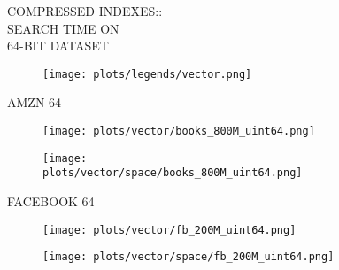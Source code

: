 \documentclass{article}
\begin{document}
\begin{figure}[!htbp]
\fbox
{
\begin{minipage}[t][0.98\textheight][t]{\textwidth}
\centering
\vspace*{-0.2cm}
    \begin{minipage}{0.23\linewidth}
    \footnotesize{COMPRESSED INDEXES::\\SEARCH TIME ON \\ 64-BIT DATASET}
    \end{minipage}
   \begin{minipage}{0.75\linewidth}
        \begin{figure}[H]
        \texttt{[image: plots/legends/vector.png]}
        \end{figure}
    \end{minipage}
    \vspace*{-10px}

    \begin{minipage}{0.03\linewidth}
    \begin{sideways}\small AMZN 64 \end{sideways}
    \end{minipage}
    \begin{minipage}{0.32\linewidth}
        \begin{figure}[H]
        \texttt{[image: plots/vector/books\_800M\_uint64.png]}
        \end{figure}
    \end{minipage}
    \begin{minipage}{0.32\linewidth}
        \begin{figure}[H]
            \texttt{[image: plots/vector/space/books\_800M\_uint64.png]}
        \end{figure}
    \end{minipage}
    \vspace*{-15px}

    \begin{minipage}{0.03\linewidth}
    \begin{sideways}\small FACEBOOK 64\end{sideways}
    \end{minipage}
    \begin{minipage}{0.32\linewidth}
        \begin{figure}[H]
        \texttt{[image: plots/vector/fb\_200M\_uint64.png]}
        \end{figure}
    \end{minipage}
    \begin{minipage}{0.32\linewidth}
        \begin{figure}[H]
            \texttt{[image: plots/vector/space/fb\_200M\_uint64.png]}
        \end{figure}
    \end{minipage}
    \vspace*{-15px}


\end{minipage}}
\end{figure}
\end{document}
